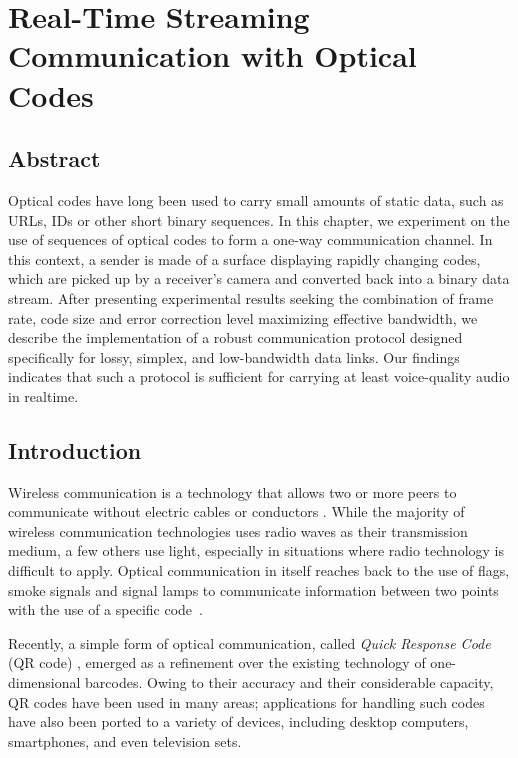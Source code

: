 
\chapter{Real-Time Streaming Communication with Optical Codes}
\vspace*{\fill}{This chapter represents a modified version of a paper published in 2016 in IEEE Access, v.4, p. 284-298 by K. Xie and S. Gaboury and S. Hallé.\clearpage}

\section*{Abstract}
Optical codes have long been used to carry small amounts of static data, such as URLs, IDs or other short binary sequences. In this chapter, we experiment on the use of sequences of optical codes to form a one-way communication channel. In this context, a sender is made of a surface displaying rapidly changing codes, which are picked up by a receiver's camera and converted back into a binary data stream. After presenting experimental results seeking the combination of frame rate, code size and error correction level maximizing effective bandwidth, we describe the implementation of a robust communication protocol designed specifically for lossy, simplex, and low-bandwidth data links. Our findings indicates that such a protocol is sufficient for carrying at least voice-quality audio in realtime.

\section{Introduction}\label{sec:qr:intro} %

Wireless communication is a technology that allows two or more peers to communicate without electric cables or conductors \cite{tse2005fundamentals}. While the majority of wireless communication technologies uses radio waves as their transmission medium, a few others use light, especially in situations where radio technology is difficult to apply. Optical communication in itself reaches back to the use of flags, smoke signals and signal lamps to communicate information between two points with the use of a specific code~\cite{burns2004}.

Recently, a simple form of optical communication, called \emph{Quick Response Code} (QR code) \cite{qrcode-about}, emerged as a refinement over the existing technology of one-dimensional barcodes. Owing to their accuracy and their considerable capacity, QR codes have been used in many areas; applications for handling such codes have also been ported to a variety of devices, including desktop computers, smartphones, and even television sets.

